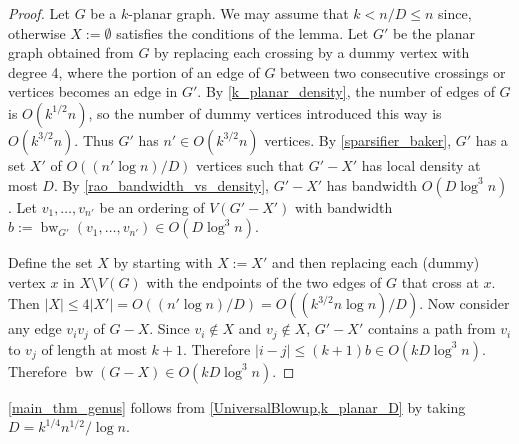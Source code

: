 \documentclass{patmorin}
\renewcommand{\le}{\leqslant}
\DeclareMathOperator{\bw}{bw}
\begin{document}
\begin{proof}
  Let $G$ be a $k$-planar graph.  We may assume that $k<n/D\le n$ since, otherwise $X:=\emptyset$ satisfies the conditions of the lemma.
  Let $G'$ be the planar graph obtained from $G$ by replacing each crossing by a dummy vertex with degree 4, where the portion of an edge of $G$ between two consecutive crossings or vertices becomes an edge in $G'$. By \cref{k_planar_density}, the number of edges of $G$ is $O(k^{1/2} n)$, so the number of dummy vertices introduced this way is $O(k^{3/2} n)$.  Thus $G'$ has $n'\in O(k^{3/2} n)$ vertices.
  By \cref{sparsifier_baker}, $G'$ has a set $X'$ of $O((n'\log n)/D)$ vertices such that $G'-X'$ has local density at most $D$.  By \cref{rao_bandwidth_vs_density}, $G'-X'$ has bandwidth $O(D\log^3 n)$. Let $v_1,\ldots,v_{n'}$ be an ordering of $V(G'-X')$ with bandwidth $b:=\bw_{G'}(v_1,\ldots,v_{n'})\in O(D\log^3 n)$.

  Define the set $X$ by starting with $X:=X'$ and then replacing each (dummy) vertex $x$ in $X\setminus V(G)$ with the endpoints of the two edges of $G$ that cross at $x$.  Then $|X|\le 4|X'|=O((n'\log n)/D) = O((k^{3/2}n\log n)/D)$. Now consider any edge $v_i v_j$ of $G-X$. Since $v_i\not\in X$ and $v_j\not\in X$, $G'-X'$ contains a path from $v_i$ to $v_j$ of length at most $k+1$.  Therefore $|i-j|\le (k+1)b\in O(kD\log^3 n)$.  Therefore $\bw(G-X)\in O(kD\log^3 n)$.
\end{proof}

\cref{main_thm_genus} follows from \cref{UniversalBlowup,k_planar_D} by taking  $D=k^{1/4}n^{1/2}/\log n$.


\end{document}
